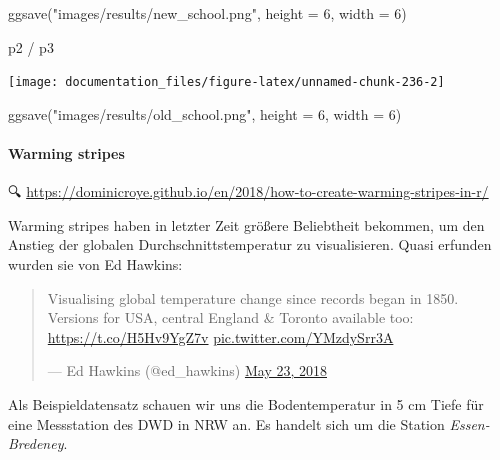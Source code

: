 \documentclass[
]{article}
\newenvironment{Shaded}{\begin{snugshade}}{\end{snugshade}}
\newcommand{\AttributeTok}[1]{\textcolor[rgb]{0.77,0.63,0.00}{#1}}
\newcommand{\DecValTok}[1]{\textcolor[rgb]{0.00,0.00,0.81}{#1}}
\newcommand{\FunctionTok}[1]{\textcolor[rgb]{0.00,0.00,0.00}{#1}}
\newcommand{\NormalTok}[1]{#1}
\newcommand{\SpecialCharTok}[1]{\textcolor[rgb]{0.00,0.00,0.00}{#1}}
\newcommand{\StringTok}[1]{\textcolor[rgb]{0.31,0.60,0.02}{#1}}
\begin{document}
\begin{Shaded}
\begin{Highlighting}[]

\FunctionTok{ggsave}\NormalTok{(}\StringTok{"images/results/new\_school.png"}\NormalTok{, }\AttributeTok{height =} \DecValTok{6}\NormalTok{, }\AttributeTok{width =} \DecValTok{6}\NormalTok{)}

\NormalTok{p2 }\SpecialCharTok{/}\NormalTok{ p3}
\end{Highlighting}
\end{Shaded}

\begin{center}\texttt{[image: documentation\_files/figure-latex/unnamed-chunk-236-2]} \end{center}

\begin{Shaded}
\begin{Highlighting}[]

\FunctionTok{ggsave}\NormalTok{(}\StringTok{"images/results/old\_school.png"}\NormalTok{, }\AttributeTok{height =} \DecValTok{6}\NormalTok{, }\AttributeTok{width =} \DecValTok{6}\NormalTok{)}
\end{Highlighting}
\end{Shaded}

\hypertarget{warming-stripes}{%
\paragraph{Warming stripes}\label{warming-stripes}}

🔍 \url{https://dominicroye.github.io/en/2018/how-to-create-warming-stripes-in-r/}

Warming stripes haben in letzter Zeit größere Beliebtheit bekommen, um den Anstieg der globalen Durchschnittstemperatur zu visualisieren. Quasi erfunden wurden sie von Ed Hawkins:

\begin{quote}
Visualising global temperature change since records began in 1850.
Versions for USA, central England \& Toronto available too:
\url{https://t.co/H5Hv9YgZ7v}
\href{https://t.co/YMzdySrr3A}{pic.twitter.com/YMzdySrr3A}

--- Ed Hawkins (@ed\_hawkins) \href{https://twitter.com/ed_hawkins/status/999242147135188993}{May 23,
2018}
\end{quote}

Als Beispieldatensatz schauen wir uns die Bodentemperatur in 5 cm Tiefe für eine Messstation des DWD in NRW an. Es handelt sich um die Station \emph{Essen-Bredeney}.
\end{document}
